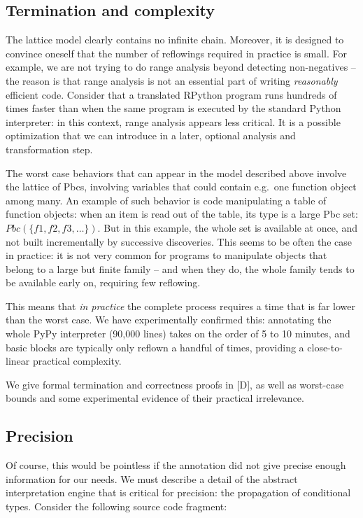 \documentclass{acm_proc_article-sp}
\begin{document}
\subsection{Termination and complexity}

The lattice model clearly contains no infinite chain.  Moreover, it is
designed to convince oneself that the number of reflowings required in
practice is small.  For example, we are not trying to do range analysis
beyond detecting non-negatives -- the reason is that range analysis is
not an essential part of writing \textit{reasonably} efficient code.  Consider
that a translated RPython program runs hundreds of times faster than
when the same program is executed by the standard Python interpreter: in
this context, range analysis appears less critical.  It is a possible
optimization that we can introduce in a later, optional analysis and
transformation step.

The worst case behaviors that can appear in the model described above
involve the lattice of Pbcs, involving variables that could contain
e.g.\ one function object among many.  An example of such behavior is
code manipulating a table of function objects: when an item is read
out of the table, its type is a large Pbc set: $Pbc(\{f1, f2, f3,
\ldots\})$.  But in this example, the whole set is available at once,
and not built incrementally by successive discoveries.  This seems to
be often the case in practice: it is not very common for programs to
manipulate objects that belong to a large but finite family -- and when
they do, the whole family tends to be available early on, requiring
few reflowing.

This means that \textit{in practice} the complete process requires a time that
is far lower than the worst case.  We have experimentally confirmed
this: annotating the whole PyPy interpreter (90,000 lines) takes on the
order of 5 to 10 minutes, and basic blocks are typically only reflown a
handful of times, providing a close-to-linear practical complexity.

We give formal termination and correctness proofs in [D], as well as
worst-case bounds and some experimental evidence of their practical
irrelevance.


\subsection{Precision}

Of course, this would be pointless if the annotation did not give
precise enough information for our needs.  We must describe a detail of
the abstract interpretation engine that is critical for precision: the
propagation of conditional types.  Consider the following source code
fragment:
\end{document}
